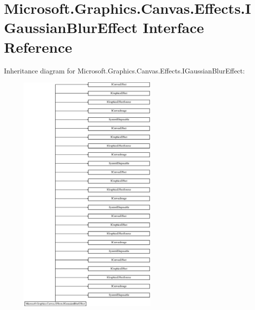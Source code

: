 \hypertarget{interface_microsoft_1_1_graphics_1_1_canvas_1_1_effects_1_1_i_gaussian_blur_effect}{}\section{Microsoft.\+Graphics.\+Canvas.\+Effects.\+I\+Gaussian\+Blur\+Effect Interface Reference}
\label{interface_microsoft_1_1_graphics_1_1_canvas_1_1_effects_1_1_i_gaussian_blur_effect}
Inheritance diagram for Microsoft.\+Graphics.\+Canvas.\+Effects.\+I\+Gaussian\+Blur\+Effect\+:\begin{figure}[H]
\begin{center}
\leavevmode
\includegraphics[height=12.000000cm]{interface_microsoft_1_1_graphics_1_1_canvas_1_1_effects_1_1_i_gaussian_blur_effect}
\end{center}
\end{figure}
